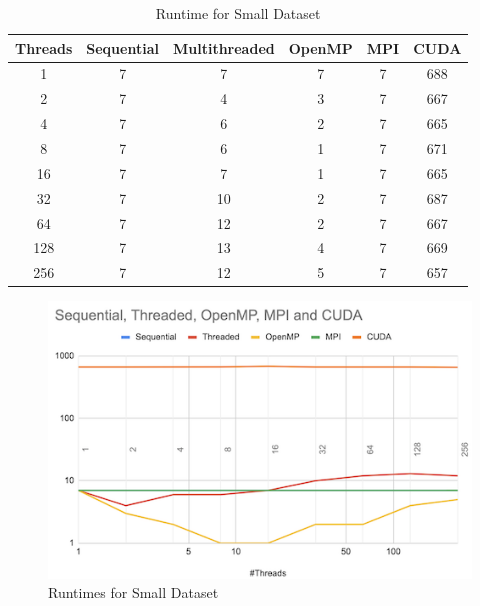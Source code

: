 \documentclass[conference]{IEEEtran}
\begin{document}
\begin{table}
    \begin{tabular}{||c | c | c | c | c | c||} 
     \hline
     Threads & Sequential & Multithreaded & OpenMP & MPI & CUDA \\ [0.2ex] 
     \hline\hline
     1	& 7	& 7	& 7 & 7 & 688\\ 
     \hline
    2 & 7 & 4 & 3 & 7 & 667\\
     \hline
    4 & 7 & 6 & 2 & 7 & 665\\
     \hline
    8 & 7 & 6 & 1 & 7 & 671\\
     \hline
    16 & 7 & 7& 1 & 7 & 665\\ [1ex] 
     \hline
    32 & 7 & 10 & 2 & 7 & 687\\ [1ex] 
     \hline
    64 & 7 & 12 & 2 & 7 & 667 \\ [1ex] 
     \hline
    128 & 7 & 13 & 4 & 7 & 669 \\ [1ex] 
     \hline
    256 & 7 & 12 & 5 & 7 & 657 \\ [1ex] 
     \hline
    \end{tabular}
\caption{\label{tab:Table1}Runtime for Small Dataset}
\end{table}

\begin{figure}[htbp]
    \centerline{\includegraphics{report/rt_small_set.png}}
    \caption{Runtimes for Small Dataset}
    \label{fig1}
\end{figure}
\end{document}
